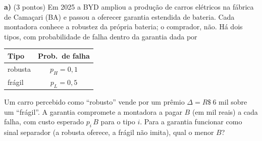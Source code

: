 \textbf{a)} (3 pontos) Em 2025 a BYD ampliou a produção de carros elétricos na fábrica de Camaçari (BA) e passou a oferecer garantia estendida de bateria. Cada montadora conhece a robustez da própria bateria; o comprador, não. Há dois tipos, com probabilidade de falha dentro da garantia dada por
\begin{center}
\begin{tabular}{lc}
Tipo & Prob.\ de falha \\
\hline
robusta & $p_H=0{,}1$ \\
frágil & $p_L=0{,}5$ \\
\end{tabular}
\end{center}
Um carro percebido como ``robusto'' vende por um prêmio $\Delta=R\$~6$ mil sobre um ``frágil''. A garantia compromete a montadora a pagar $B$ (em mil reais) a cada falha, com custo esperado $p_i\,B$ para o tipo $i$. Para a garantia funcionar como sinal separador (a robusta oferece, a frágil não imita), qual o menor $B$?

